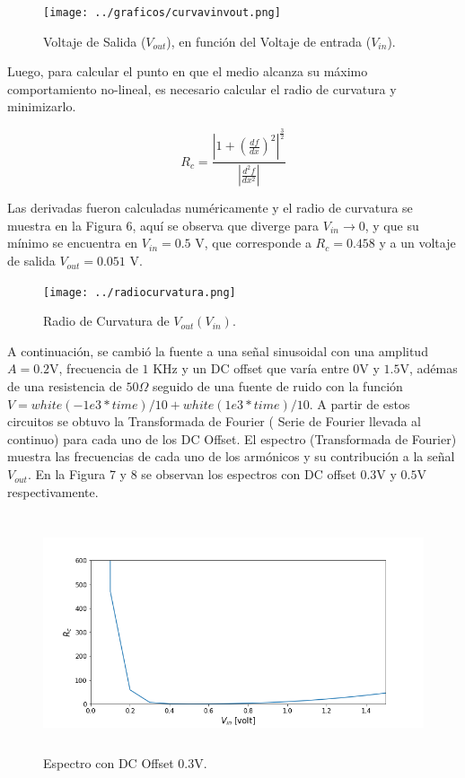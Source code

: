\documentclass[letterpaper,oneside]{article}
\begin{document}
\begin{figure}
  \centering
  \texttt{[image: ../graficos/curvavinvout.png]}
  \caption{Voltaje de Salida ($V_{out}$), en función del Voltaje de entrada ($V_{in}$).}
\end{figure}

Luego, para calcular el punto en que el medio alcanza su máximo comportamiento no-lineal, es necesario calcular el radio de curvatura y minimizarlo.

\begin{equation}
    R_c = \frac{|1+(\frac{df}{dx})^2|^{\frac{3}{2}}}{|\frac{d^2f}{dx^2}|}
\end{equation}

Las derivadas fueron calculadas numéricamente y el radio de curvatura se muestra en la Figura 6, aquí se observa que diverge para $V_{in} \rightarrow 0$, y que su mínimo se encuentra en $V_{in}= 0.5$ V, que corresponde a $R_c = 0.458$ y a un voltaje de salida $V_{out}=0.051$ V.

\begin{figure}
  \centering
  \texttt{[image: ../radiocurvatura.png]}
  \caption{Radio de Curvatura de $V_{out}(V_{in})$.}
\end{figure}

A continuación, se cambió la fuente a una señal sinusoidal con una amplitud $A=0.2$V, frecuencia de $1$ KHz y un DC offset que varía entre $0$V y $1.5$V, adémas de una resistencia de $50\Omega$ seguido de una fuente de ruido con la función $V=white(-1e3*time)/10 + white(1e3*time)/10$. A partir de estos circuitos se obtuvo la Transformada de Fourier ( Serie de Fourier llevada al continuo) para cada uno de los DC Offset. El espectro (Transformada de Fourier) muestra las frecuencias de cada uno de los armónicos y su contribución a la señal $V_{out}$. 
En la Figura 7 y 8 se observan los espectros con DC offset $0.3$V y $0.5$V respectivamente. 

\begin{figure}
  \centering
  \includegraphics[height=7cm]{radiocurvatura.png}
  \caption{Espectro con DC Offset $0.3$V.}
\end{figure}
\end{document}

